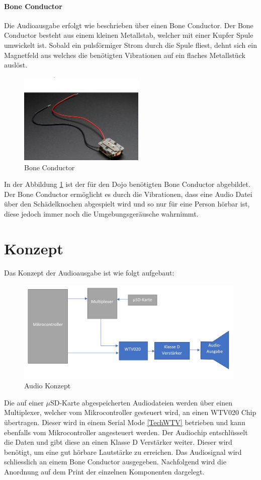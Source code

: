 \paragraph{Bone Conductor}
Die Audioausgabe erfolgt wie beschrieben über einen Bone Conductor. Der Bone Conductor besteht aus einem kleinen Metallstab, welcher mit einer Kupfer Spule umwickelt ist. Sobald ein pulsförmiger Strom durch die Spule fliest, dehnt sich ein Magnetfeld aus welches die benötigten Vibrationen auf ein flaches Metallstück auslöst. 
\begin{figure}[h]
	\centering
	\includegraphics[width=6cm]{Bilder/Bone-Conductor.jpg}
	\caption[Bone Conductor]{Bone Conductor \cite{BoneConductor}}
	\label{Bone-Conductor}
\end{figure}

In der Abbildung \ref{Bone-Conductor} ist der für den Dojo benötigten Bone Conductor abgebildet. Der Bone Conductor ermöglicht es durch die Vibrationen, dass eine Audio Datei über den Schädelknochen abgespielt wird und so nur für eine Person hörbar ist, diese jedoch immer noch die Umgebungsgeräusche wahrnimmt. \cite{BoneConductor}



\section{Konzept}\label{AudioKonzept}
Das Konzept der Audioausgabe ist wie folgt aufgebaut:
\begin{figure}[h]
	\centering
	\includegraphics[width=11cm]{Bilder/Audio-Konzept.jpg}
	\caption{Audio Konzept}
	\label{Audio-Konzept}
\end{figure}
Die auf einer $\mu$SD-Karte abgespeicherten Audiodateien werden über einen Multiplexer, welcher vom Mikrocontroller gesteuert wird, an einen WTV020 Chip übertragen. Dieser wird in einem Serial Mode \ref{TechWTV} betrieben und kann ebenfalls vom Mikrocontroller angesteuert werden. Der Audiochip entschlüsselt die Daten und gibt diese an einen Klasse D Verstärker weiter. Dieser wird benötigt, um eine gut hörbare Lautstärke zu erreichen. Das Audiosignal wird schliesslich an einem Bone Conductor ausgegeben. 
Nachfolgend wird die Anordnung auf dem Print der einzelnen Komponenten dargelegt. 
